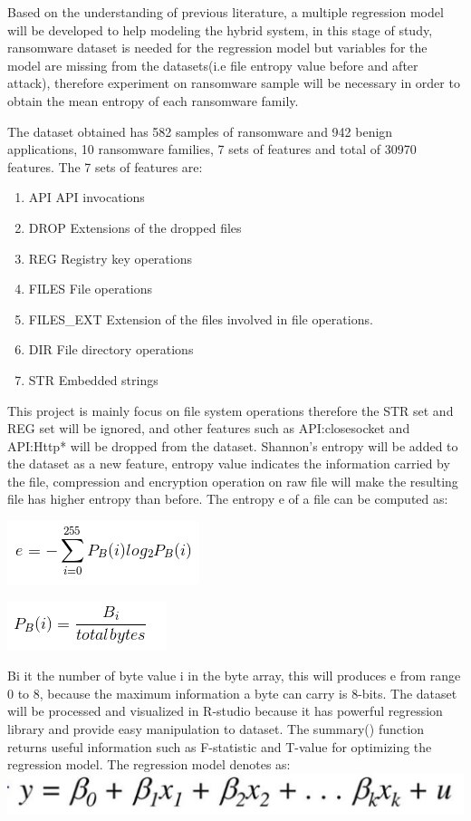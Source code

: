 \documentclass[]{PLR-ShaofengLiu}
\begin{document}
Based on the understanding of previous literature, a multiple regression model will be developed to help modeling the hybrid system, in this stage of study, ransomware dataset is needed for the regression model but variables for the model are missing from the datasets(i.e file entropy value before and after attack), therefore experiment on ransomware sample will be necessary in order to obtain the mean entropy of each ransomware family.

The dataset obtained has 582 samples of ransomware and 942 benign applications, 10 ransomware families, 7 sets of features and total of 30970 features. The 7 sets of features are:

  \begin{enumerate}

    \item API API invocations
    \item DROP Extensions of the dropped files
    \item REG Registry key operations
    \item FILES File operations
    \item FILES\_EXT Extension of the files involved in file operations.
    \item DIR File directory operations
    \item STR Embedded strings
          
  \end{enumerate}
  This project is mainly focus on file system operations therefore the STR set and 
  REG set will be ignored, and other features such as API:closesocket and API:Http* 
  will be dropped from the dataset. 
Shannon’s entropy will be added to the dataset as a new feature, entropy value 
indicates the information carried by the file, compression and encryption operation 
on raw file will make the resulting file has higher entropy than before. The entropy 
e of a file can be computed as:

\includegraphics{entropy.png}

\includegraphics{entropy1.png}

Bi it the number of byte value i in the byte array, this will produces e from range 0 to 8, because the maximum information a byte can carry is 8-bits.
The dataset will be processed and visualized in R-studio because it has powerful regression library and provide easy manipulation to dataset. The summary() function returns useful information such as F-statistic and T-value for optimizing the regression model. The regression model denotes as:
\includegraphics{MRR.png}
\end{document}
